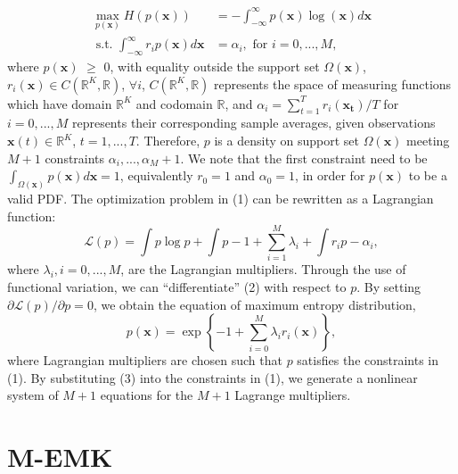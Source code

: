 \documentclass[conference]{IEEEtran}
\begin{document}
\begin{equation}
\begin{split}
\max_{{p(\mathbf{x})}}  H(p(\mathbf{x})) & = - \int_{-\infty}^{\infty} p(\mathbf{x})\log(\mathbf{x})d \mathbf{x} \\
\text{ s.t. } \int_{-\infty}^{\infty} r_i p(\mathbf{x}) d \mathbf{x} &= \alpha_i,
\text{ for }  i = 0,...,M,
\end{split}
\end{equation}
%
where $p(\mathbf{x})$ $\geq$ 0,  with equality outside the support set $\Omega(\mathbf{x})$, $r_i(\mathbf{x})\in C(\mathbb{R}^{K},\mathbb{R})$, $\forall i$, $C(\mathbb{R}^{K},\mathbb{R})$ represents the space of measuring functions which have domain $\mathbb{R}^{K}$ and codomain $\mathbb{R}$, and $\alpha_i = \sum_{t=1}^{T}  r_i(\mathbf{x_t})/T$ for $i = 0,...,M$ represents their corresponding sample averages, given observations $\mathbf{x}(t) \in \mathbb{R}^{K}$, $t = 1,...,T$. Therefore, $p$ is a density on support set $\Omega(\mathbf{x})$ meeting $M + 1$ constraints $\alpha_i,...,\alpha_M+1$. We note that the first constraint need to be $\int_{\Omega(\mathbf{x})} p(\mathbf{x}) d \mathbf{x} = 1$, equivalently $r_0 = 1$ and $\alpha_0 = 1$, in order for $p(\mathbf{x})$ to be a valid PDF.  The optimization problem in (1) can be rewritten as a Lagrangian function:
%
\begin{equation}
\mathcal{L}(p) = \int p\log p + \int p - 1 + \sum_{i=1}^{M}\lambda_i + \int r_i p - \alpha_i ,
\end{equation}
%	
where  $\lambda_i, i = 0,...,M$,  are the Lagrangian multipliers. Through the use of functional variation, we can “differentiate” (2) with respect to $p$. By setting $\partial\mathcal{L}(p)/\partial p = 0$, we obtain the equation of maximum entropy distribution,
%
\begin{equation}
p(\mathbf{x}) = \exp\left\{-1 + \sum_{i=0}^{M}\lambda_i r_i\left(\mathbf{x}\right)\right\},
\end{equation}
%
where Lagrangian multipliers are chosen such that $p$ satisfies the constraints in (1). By substituting (3) into the constraints in (1), we generate a nonlinear system of $M + 1$ equations for the $M + 1$ Lagrange multipliers. 

\section{M-EMK}
\end{document}
